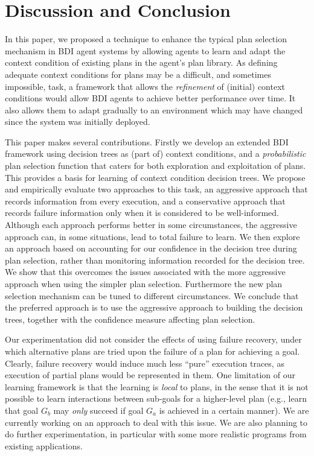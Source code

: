 \section{Discussion and Conclusion}\label{sec:discussion}

In this paper, we proposed a technique to enhance the typical plan selection mechanism
in BDI agent systems by allowing agents to learn and adapt the context condition of existing plans
in the agent's plan library.
%
As defining adequate context conditions for plans may be a difficult, and
sometimes 
impossible, task, a framework that allows the \emph{refinement} of (initial) context
conditions would allow BDI agents to achieve better performance over
time. It also allows them to adapt gradually to an environment which
may have changed since the system was initially deployed.
%

This paper makes several contributions. Firstly we develop an extended
BDI framework using decision trees as (part of) context conditions,
and a \textit{probabilistic} plan selection function that caters for
both exploration and exploitation of plans. This provides a basis for
learning of context condition decision trees.  We propose and
empirically evaluate two approaches to this task, an aggressive
approach that records information from every execution, and a
conservative approach that records failure information only when it is
considered to be well-informed. Although each approach performs better
in some circumstances, the aggressive approach can, in some
situations, lead to total failure to learn. We then explore an
approach based on accounting for our confidence in the decision tree
during plan selection, rather than monitoring information recorded for
the decision tree. We show that this overcomes the issues associated
with the more aggressive approach when using the simpler plan
selection. Furthermore the new plan selection mechanism can be tuned to
different circumstances. We conclude that the preferred approach is to
use the aggressive approach to building the decision trees, together
with the confidence measure affecting plan selection.

Our experimentation did not consider the effects of using failure
recovery, under which alternative plans are tried upon the failure of
a plan for achieving a goal. Clearly, failure recovery would induce
much less ``pure'' execution traces, as execution of partial plans
would be represented in them. 
%
One limitation of our learning framework is that the learning is
\emph{local} to plans, in the sense that it is not possible to learn
interactions between sub-goals for a higher-level plan (e.g., learn
that goal $G_b$ may \textit{only} succeed if goal $G_a$ is achieved in
a certain manner). We are currently working on an approach to deal
with this issue.
%
We are also planning to do further experimentation, in particular with some more realistic
programs from existing applications. 




